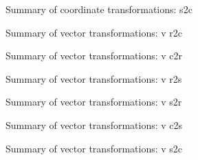 \documentclass[10pt]{beamer}
\begin{document}
\begin{frame}[shrink=00]{Summary of coordinate transformations: s2c}

\newpage
\small

\normalsize
\newpage
\end{frame}

\begin{frame}[shrink=00]{Summary of vector transformations: v r2c}

\newpage
\small

\normalsize
\newpage
\end{frame}


\begin{frame}[shrink=00]{Summary of vector transformations: v c2r}

\newpage
\small

\normalsize
\newpage
\end{frame}


\begin{frame}[shrink=00]{Summary of vector transformations: v r2s}

\newpage
\small

\normalsize
\newpage
\end{frame}


\begin{frame}[shrink=00]{Summary of vector transformations: v s2r}

\newpage
\small

\normalsize
\newpage
\end{frame}


\begin{frame}[shrink=00]{Summary of vector transformations: v c2s}

\newpage
\small

\normalsize
\newpage
\end{frame}


\begin{frame}[shrink=00]{Summary of vector transformations: v s2c}

\newpage
\small

\normalsize
\newpage
\end{frame}
\end{document}
